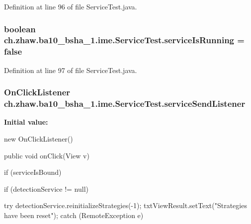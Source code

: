 Definition at line 96 of file ServiceTest.java.\hypertarget{classch_1_1zhaw_1_1ba10__bsha__1_1_1ime_1_1ServiceTest_a9e8f69bb91fbb935e81e07c927bc07ed}{
\subsubsection[{serviceIsRunning}]{\setlength{\rightskip}{0pt plus 5cm}boolean {\bf ch.zhaw.ba10\_\-bsha\_\-1.ime.ServiceTest.serviceIsRunning} = false}}
\label{classch_1_1zhaw_1_1ba10__bsha__1_1_1ime_1_1ServiceTest_a9e8f69bb91fbb935e81e07c927bc07ed}


Definition at line 97 of file ServiceTest.java.\hypertarget{classch_1_1zhaw_1_1ba10__bsha__1_1_1ime_1_1ServiceTest_af3586f921944718d5308e283836cd92f}{
\subsubsection[{serviceSendListener}]{\setlength{\rightskip}{0pt plus 5cm}OnClickListener {\bf ch.zhaw.ba10\_\-bsha\_\-1.ime.ServiceTest.serviceSendListener}}}
\label{classch_1_1zhaw_1_1ba10__bsha__1_1_1ime_1_1ServiceTest_af3586f921944718d5308e283836cd92f}
{\bfseries Initial value:}
\begin{DoxyCode}
 new OnClickListener() {
        public void onClick(View v) {
                if (serviceIsBound) {
                
                
                if (detectionService != null) {
                    try {
                        detectionService.reinitializeStrategies(-1);
                        txtViewResult.setText("Strategies have been reset");
                    } catch (RemoteException e) {
                        
                        
                    }
                }
            }
        }
    }
\end{DoxyCode}


